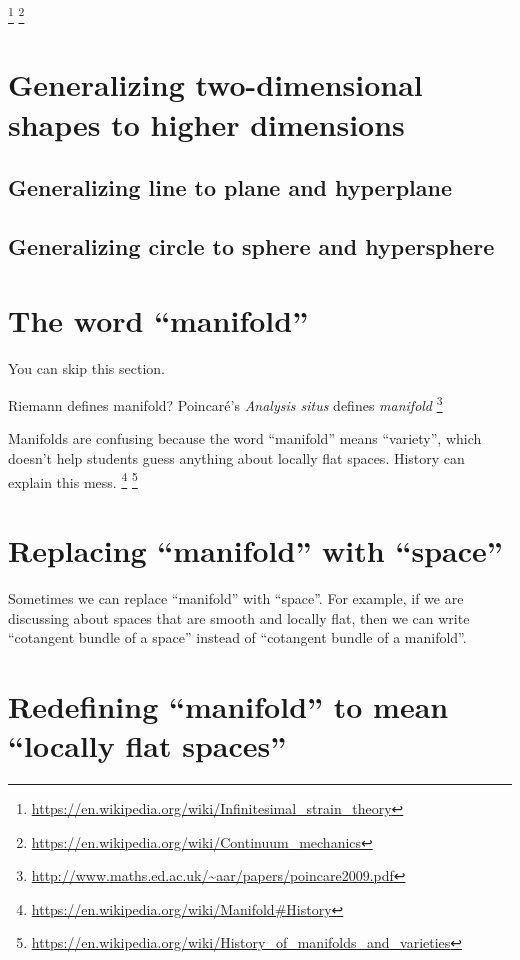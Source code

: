 \footnote{\url{https://en.wikipedia.org/wiki/Infinitesimal_strain_theory}}
\footnote{\url{https://en.wikipedia.org/wiki/Continuum_mechanics}}

\section{Generalizing two-dimensional shapes to higher dimensions}

\subsection{Generalizing line to plane and hyperplane}

\subsection{Generalizing circle to sphere and hypersphere}

\section{The word \enquote{manifold}}

You can skip this section.

Riemann defines manifold?
Poincar\'e's \emph{Analysis situs} defines \emph{manifold}%
\footnote{\url{http://www.maths.ed.ac.uk/~aar/papers/poincare2009.pdf}}

Manifolds are confusing
because the word \enquote{manifold} means \enquote{variety},
which doesn't help students guess anything about locally flat spaces.
History can explain this mess.%
\footnote{\url{https://en.wikipedia.org/wiki/Manifold\#History}}%
\footnote{\url{https://en.wikipedia.org/wiki/History_of_manifolds_and_varieties}}

\section*{Replacing \enquote{manifold} with \enquote{space}}

Sometimes we can replace \enquote{manifold} with \enquote{space}.
For example, if we are discussing about spaces that are smooth and locally flat,
then we can write \enquote{cotangent bundle of a space}
instead of \enquote{cotangent bundle of a manifold}.

\section*{Redefining \enquote{manifold} to mean \enquote{locally flat spaces}}

